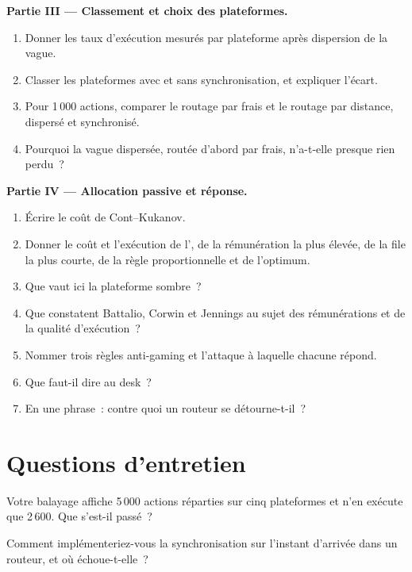 \begin{problem}
\medskip\noindent\textbf{Partie III --- Classement et choix des plateformes.}
\begin{enumerate}[resume]
\item Donner les taux d'exécution mesurés par plateforme après dispersion de la vague.
\item Classer les plateformes avec et sans synchronisation, et expliquer l'écart.
\item Pour 1\,000 actions, comparer le routage par frais et le routage par distance, dispersé et synchronisé.
\item Pourquoi la vague dispersée, routée d'abord par frais, n'a-t-elle presque rien perdu~?
\end{enumerate}

\medskip\noindent\textbf{Partie IV --- Allocation passive et réponse.}
\begin{enumerate}[resume]
\item Écrire le coût de Cont--Kukanov.
\item Donner le coût et l'exécution de l', de la rémunération la plus élevée, de la file la plus courte, de la règle proportionnelle et de l'optimum.
\item Que vaut ici la plateforme sombre~?
\item Que constatent Battalio, Corwin et Jennings au sujet des rémunérations et de la qualité d'exécution~?
\item Nommer trois règles anti-gaming et l'attaque à laquelle chacune répond.
\item Que faut-il dire au desk~?
\item En une phrase~: contre quoi un routeur se détourne-t-il~?
\end{enumerate}
\end{problem}

\section{Questions d'entretien}

\begin{interviewq}\label{iq:mx:smart-order-routing:1}
Votre balayage affiche 5\,000 actions réparties sur cinq plateformes et n'en exécute que 2\,600. Que s'est-il passé~?
\end{interviewq}

\begin{interviewq}\label{iq:mx:smart-order-routing:2}
Comment implémenteriez-vous la synchronisation sur l'instant d'arrivée dans un routeur, et où échoue-t-elle~?
\end{interviewq}

